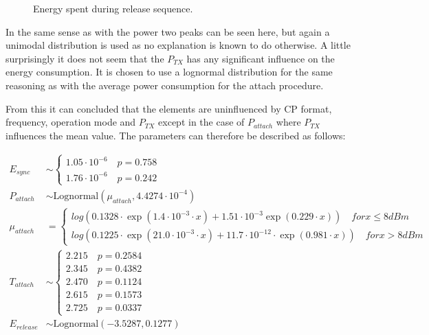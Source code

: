 \begin{figure}[H]
\centering
\begin{minipage}{0.48\textwidth}
\resizebox{\textwidth}{!}{
}
\end{minipage}
\hfill
\begin{minipage}{0.48\textwidth}
\resizebox{\textwidth}{!}{
}
\end{minipage}
\caption{Energy spent during release sequence.}
\label{fig:Release_Points}
\end{figure}

In the same sense as with the power two peaks can be seen here, but again a unimodal distribution is used as no explanation is known to do otherwise. A little surprisingly it does not seem that the $P_{TX}$ has any significant influence on the energy consumption. It is chosen to use a lognormal distribution for the same reasoning as with the average power consumption for the attach procedure.   


From this it can concluded that the elements are uninfluenced by CP format, frequency, operation mode and $P_{TX}$ except in the case of $P_{attach}$ where $P_{TX}$ influences the mean value. The parameters can therefore be described as follows:

\begin{align}
E_{sync} &\sim\begin{cases} 1.05\cdot 10^{-6} \quad p = 0.758\\
1.76\cdot 10^{-6} \quad p = 0.242
\end{cases}\\
P_{attach} &\sim\text{Lognormal}(\mu_{attach},4.4274\cdot 10^{-4}) \\
\mu_{attach} &= \begin{cases} log\left(0.1328\cdot\exp(1.4\cdot 10^{-3}\cdot x) + 1.51\cdot 10^{-3}\exp(0.229\cdot x)\right) \quad for x \leq 8 dBm \\
log\left(0.1225\cdot\exp(21.0\cdot 10^{-3}\cdot x) + 11.7\cdot 10^{-12}\cdot \exp(0.981\cdot x)\right) \quad for x > 8 dBm \end{cases} \\
T_{attach} &\sim\begin{cases} 2.215 \quad p = 0.2584\\
2.345 \quad p = 0.4382\\
2.470 \quad p = 0.1124\\
2.615 \quad p = 0.1573\\
2.725 \quad p = 0.0337
\end{cases}\\
E_{release} &\sim \text{Lognormal}(-3.5287,0.1277)
\end{align}




